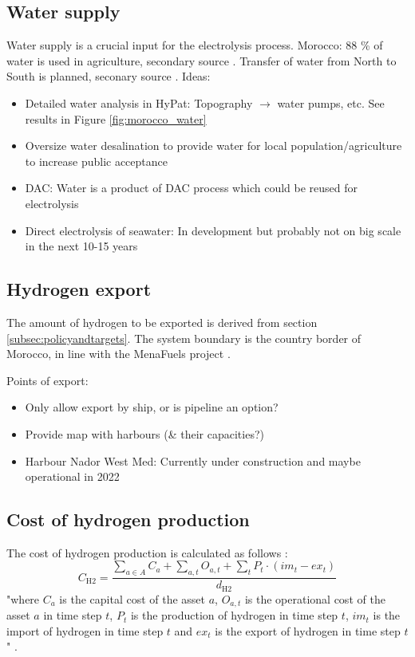 \subsection{Water supply}
\label{subsec:water_supply}
Water supply is a crucial input for the electrolysis process. 
Morocco: 88 \% of water is used in agriculture, secondary source \cite{Ersoy2022}.
Transfer of water from North to South is planned, seconary source \cite{Ersoy2022}.
Ideas:
\begin{itemize}
    \item Detailed water analysis in HyPat: Topography $\rightarrow$ water pumps, etc. See results in Figure \ref{fig:morocco_water}
    \item Oversize water desalination to provide water for local population/agriculture to increase public acceptance
    \item DAC: Water is a product of DAC process which could be reused for electrolysis
    \item Direct electrolysis of seawater: In development but probably not on big scale in the next 10-15 years
\end{itemize}



\subsection{Hydrogen export}
\label{subsec:hydrogen_export}
The amount of hydrogen to be exported is derived from section \ref{subsec:policyandtargets}.
The system boundary is the country border of Morocco, in 
line with the MenaFuels project \cite{Ersoy2022}.

Points of export:
\begin{itemize}
    \item Only allow export by ship, or is pipeline an option?
    \item Provide map with harbours (\& their capacities?)
    \item Harbour Nador West Med: Currently under construction and maybe operational in 2022 \cite{Ersoy2022}
\end{itemize}


\subsection{Cost of hydrogen production}
\label{subsec:cost_of_hydrogen_production}

The cost of hydrogen production is calculated as follows \cite{Zeyen2022}:
\begin{equation}
    \label{eq:cost_of_hydrogen_production}
    C_\mathrm{H2}= \frac{\sum \limits_{a\in A}^{} C_a + \sum \limits_{a,t} O_{a,t} + \sum \limits_{t} P_t \cdot (im_t - ex_t)   }{d_\mathrm{H2}}
\end{equation}
"where $C_a$ is the capital cost of the asset $a$, $O_{a,t}$ is the operational cost of the asset $a$ in time step $t$, $P_t$ is the production of hydrogen in time step $t$, $im_t$ is the import of hydrogen in time step $t$ and $ex_t$ is the export of hydrogen in time step $t$" \cite{Zeyen2022}.

